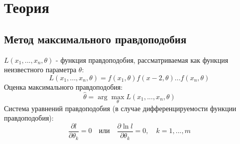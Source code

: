 \documentclass[12pt,a4paper]{article}
\begin{document}
	\section{Теория}
		\subsection{Метод максимального правдоподобия}
			$L(x_1, ... , x_n, \theta)$ - функция правдоподобия, рассматриваемая как функция неизвестного параметра $\theta$:
			\begin{equation}
				L(x_1, ... , x_n, \theta)=f(x_1, \theta)f(x-2, \theta)...f(x_n, \theta)	
			\end{equation}
			Оценка максимального правдоподобия:
			\begin{equation}
				\hat{\theta} = \arg{\underset{\theta}\max} L(x_1, ... , x_n, \theta)
			\end{equation}
			Система уравнений правдоподобия (в случае дифференцируемости функции правдоподобия):
			\begin{equation}
				\frac{\partial{l}}{\partial{\theta_k}}=0 \quad \text{или} \quad \frac{\partial{\ln{l}}}{\partial{\theta_k}}=0, \quad k=1,...,m
			\end{equation}
	
\end{document}
